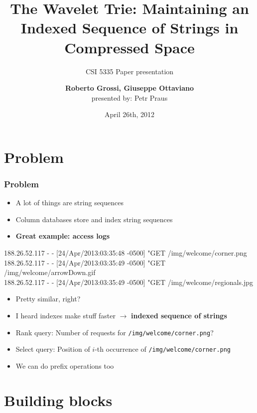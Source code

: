 \documentclass{beamer}
\title[The Wavelet Trie]{The Wavelet Trie: Maintaining an Indexed Sequence of
Strings in Compressed Space}
\subtitle{CSI 5335 Paper presentation}
\author[Roberto Grossi, Giuseppe Ottaviano]{{\bf Roberto Grossi, Giuseppe
Ottaviano}\\
presented by: Petr Praus}
\date{April 26th, 2012}
\newenvironment{changemargin}[2]{%
  \begin{list}{}{%
    \setlength{\topsep}{0pt}%
    \setlength{\leftmargin}{#1}%
    \setlength{\rightmargin}{#2}%
    \setlength{\listparindent}{\parindent}%
    \setlength{\itemindent}{\parindent}%
    \setlength{\parsep}{\parskip}%
  }%
  \item[]}{\end{list}}
\begin{document}
\section{Problem}

\begin{frame}
\frametitle{Problem}
\begin{itemize}
  \item A lot of things are string sequences
  \item Column databases store and index string sequences
  \item {\bf Great example: access logs}
\end{itemize}
\vspace{10pt}
{\scriptsize
188.26.52.117 - - [24/Apr/2013:03:35:48 -0500] "GET /img/welcome/corner.png\\
188.26.52.117 - - [24/Apr/2013:03:35:49 -0500] "GET /img/welcome/arrowDown.gif\\
188.26.52.117 - - [24/Apr/2013:03:35:49 -0500] "GET /img/welcome/regionals.jpg\\
}
\vspace{10pt}
\begin{changemargin}{-15pt}{-15pt}
\begin{itemize}
  \item Pretty similar, right?
  \item I heard indexes make stuff faster $\rightarrow$ \textbf{indexed sequence of strings}
  \item Rank query: Number of requests for \texttt{/img/welcome/corner.png}?
  \item Select query: Position of $i$-th occurrence of \texttt{/img/welcome/corner.png}
  \item We can do prefix operations too
\end{itemize}
\end{changemargin}
\end{frame}

\begin{frame}
\titlepage
\end{frame}


\section{Building blocks}
\end{document}

